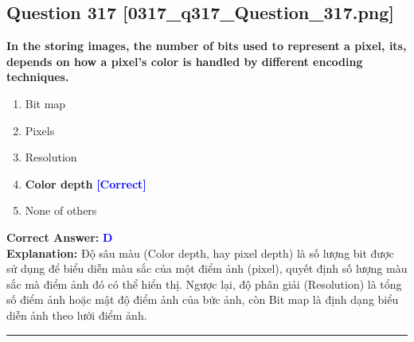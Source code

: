 \documentclass[11pt,a4paper]{article}
\begin{document}
\begin{minipage}{\textwidth}
\subsection*{Question 317 \quad \footnotesize{[0317\_q317\_Question\_317.png]}}
\noindent \textbf{In the storing images, the number of bits used to represent a pixel, its, depends on how a pixel's color is handled by different encoding techniques.}

\begin{enumerate}[label=\Alph*.]
    \item Bit map
    \item Pixels
    \item Resolution
    \item \textbf{Color depth} \hfill \textcolor{blue}{\textbf{[Correct]}}
    \item None of others
\end{enumerate}

\noindent \textbf{Correct Answer:} \textcolor{blue}{\textbf{D}} \\[2pt]
\noindent \textbf{Explanation:} Độ sâu màu (Color depth, hay pixel depth) là số lượng bit được sử dụng để biểu diễn màu sắc của một điểm ảnh (pixel), quyết định số lượng màu sắc mà điểm ảnh đó có thể hiển thị. Ngược lại, độ phân giải (Resolution) là tổng số điểm ảnh hoặc mật độ điểm ảnh của bức ảnh, còn Bit map là định dạng biểu diễn ảnh theo lưới điểm ảnh.

\par\vspace{0.3cm}
\hrule
\vspace{0.3cm}
\end{minipage}
\end{document}
